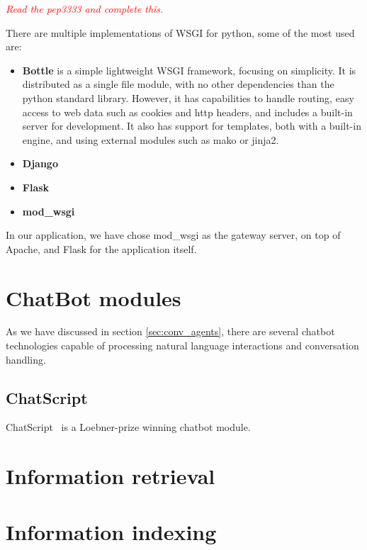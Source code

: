 \emph{\textcolor{red}{Read the pep3333 and complete this.}}

There are multiple implementations of WSGI for python, some of the most used are:

\begin{itemize}
 \item \textbf{Bottle} is a simple lightweight WSGI framework, focusing on simplicity. It is distributed as a single file module, with no other dependencies than the python standard library. However, it has capabilities to handle routing, easy access to web data such as cookies and http headers, and includes a built-in server for development. It also has support for templates, both with a built-in engine, and using external modules such as mako or jinja2.
 \item \textbf{Django} 
 \item \textbf{Flask}
 \item \textbf{mod\_wsgi}
\end{itemize}

In our application, we have chose mod\_wsgi as the gateway server, on top of Apache, and Flask for the application itself.


\section{ChatBot modules}

As we have discussed in section \ref{sec:conv_agents}, there are several chatbot technologies capable of processing natural language interactions and conversation handling.

\subsection{ChatScript}
\label{subsec:chatscript}

ChatScript~\cite{wilcox2013} is a Loebner-prize winning chatbot module.

\section{Information retrieval}


\section{Information indexing}

